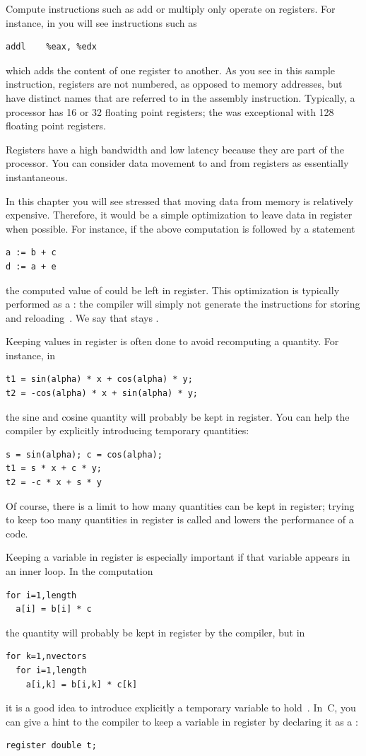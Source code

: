 Compute instructions such as add or multiply only operate on
registers. For instance, in 
you will see instructions such as
\begin{verbatim}
addl	%eax, %edx
\end{verbatim}
which adds the content of one register to
another. As you see in this sample instruction, registers are not
numbered, as opposed to memory addresses,
but have distinct names that are referred to in
the assembly instruction. Typically, a processor has 16 or 32
floating point registers; the  was
exceptional with 128 floating point registers.

Registers have a high bandwidth and low latency because they
are part of the processor. You can consider data movement to and from
registers as essentially instantaneous.

In this chapter you will see stressed that moving data from memory is
relatively expensive. Therefore, it would be a simple optimization to
leave data in register when possible. For instance, if the above
computation is followed by a statement
\begin{verbatim}
a := b + c
d := a + e
\end{verbatim}
the computed value of  could be left in register. This
optimization is typically performed as a
: the compiler will simply not
generate the instructions for storing and reloading~. We say that
 stays .

Keeping values in register is often done to avoid recomputing a
quantity. For instance, in 
\begin{verbatim}
t1 = sin(alpha) * x + cos(alpha) * y;
t2 = -cos(alpha) * x + sin(alpha) * y;
\end{verbatim}
the sine and cosine quantity will probably be kept in register. You
can help the compiler by explicitly introducing temporary quantities:
\begin{verbatim}
s = sin(alpha); c = cos(alpha);
t1 = s * x + c * y;
t2 = -c * x + s * y
\end{verbatim}
Of
course, there is a limit to how many quantities can be kept in
register; trying to keep too many quantities in register is called
 and lowers the performance of a code.

Keeping a variable in register is especially important if that
variable appears in an inner loop. In the computation
\begin{verbatim}
for i=1,length
  a[i] = b[i] * c
\end{verbatim}
the quantity  will probably be kept in register by the compiler,
but in 
\begin{verbatim}
for k=1,nvectors
  for i=1,length
    a[i,k] = b[i,k] * c[k]
\end{verbatim}
it is a good idea to introduce explicitly a temporary variable to
hold~. In~C, you can give a hint to the compiler
to keep a variable in register by declaring it as a :
\begin{verbatim}
register double t;
\end{verbatim}

